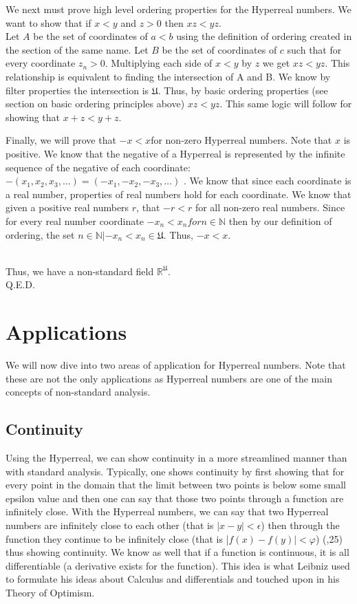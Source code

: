 \documentclass[12pt]{report}
\newcommand{\R}{\mathbb{R}}
\newcommand{\N}{\mathbb{N}}
\newcommand{\U}{\mathfrak{U}}
\begin{document}
We next must prove high level ordering properties for the Hyperreal numbers. \newline
We want to show that if $x<y$ and $z>0$ then $xz<yz$. \\
Let $A$ be the set of coordinates of $a<b$ using the definition of ordering created in the section of the same name.
Let $B$ be the set of coordinates of $c$ such that for every coordinate $z_n > 0$.
Multiplying each side of $x<y$ by $z$ we get $xz<yz$.
This relationship is equivalent to finding the intersection of A and B.
We know by filter properties the intersection is $\U$.
Thus, by basic ordering properties (see section on basic ordering principles above) $xz<yz$.
This same logic will follow for showing that $x+z < y+z$.

\newline \par
Finally, we will prove that $-x <x $for non-zero Hyperreal numbers.
Note that $x$ is positive.
We know that the negative of a Hyperreal is represented by the infinite sequence of the negative of each coordinate: $-(x_1, x_2,x_3,\ldots) = (-x_1,- x_2,-x_3,\ldots)$ .
We know that since each coordinate is a real number, properties of real numbers hold for each coordinate.
We know that given a positive real numbers $r$, that $-r< r$ for all non-zero real numbers.
Since for every real number coordinate $-x_n <x_n for n \in \N $ then by our definition of ordering, the set ${n \in \N| -x_n < x_n } \in \U$.
Thus, $-x <x $.

\\ \newline
Thus, we have a non-standard field $\R^{\U}$.\\
Q.E.D.


\chapter{Applications}
We will now dive into two areas of application for Hyperreal numbers.
Note that these are not the only applications as Hyperreal numbers are one of the main concepts of non-standard analysis.
\section*{Continuity}
Using the Hyperreal, we can show continuity in a more streamlined manner than with standard analysis.
Typically, one shows continuity by first showing that for every point in the domain that the limit between two points is below some small epsilon value and then one can say that those two points through a function are infinitely close.
With the Hyperreal numbers, we can say that two Hyperreal numbers are infinitely close to each other (that is $|x-y|< \epsilon$) then through the function they continue to be infinitely close (that is |$f(x)-f(y)|<\varphi$) (\citeauthor{Goldbring},25) thus showing continuity.
We know as well that if a function is continuous, it is all differentiable (a derivative exists for the function).
This idea is what Leibniz used to formulate his ideas about Calculus and differentials and touched upon in his Theory of Optimism.
\end{document}
